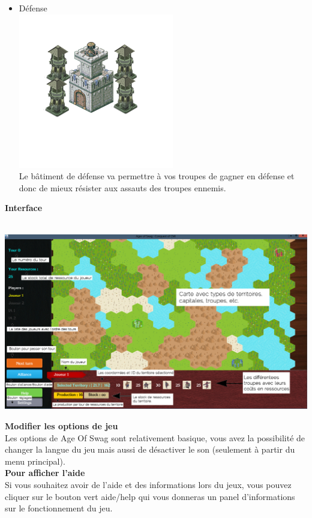 \begin{itemize}
    \item Défense\\
    \includegraphics[scale=0.3]{bat/ram.png}\\
         Le bâtiment de défense va permettre à vos troupes de gagner en défense et donc de mieux résister aux assauts des troupes ennemis.\\
    
  \end{itemize}
   \textbf{Interface }\\
 \\
  \begin{center}
\includegraphics[scale=0.31]{help.jpg} \\
\end{center}

   \textbf{Modifier les options de jeu}\\

Les options de Age Of Swag sont relativement basique, vous avez la possibilité de changer la langue du jeu mais aussi de désactiver le son (seulement à partir du menu principal).\\
   
   \textbf{Pour afficher l'aide}\\
   Si vous souhaitez avoir de l'aide et des informations lors du jeux, vous pouvez cliquer sur le bouton vert aide/help qui vous donneras un panel d'informations sur le fonctionnement du jeu.